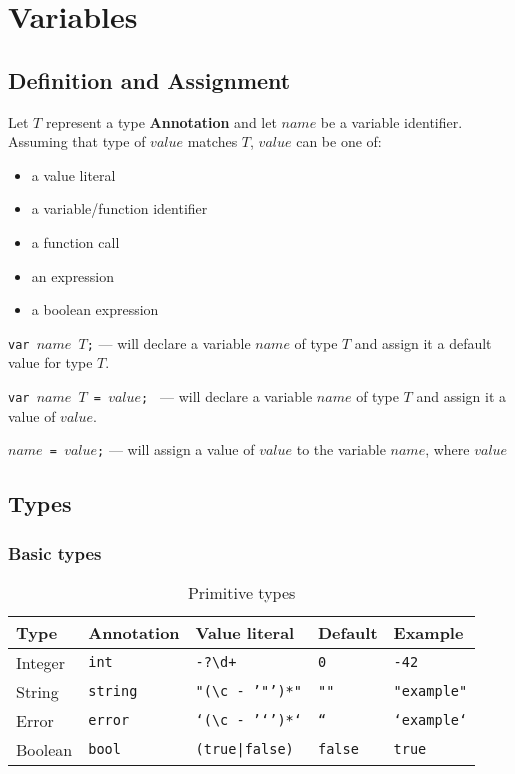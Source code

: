 \documentclass{article}
\begin{document}
\section{Variables}

\subsection{Definition and Assignment}
Let $T$ represent a type \textbf{Annotation} and let $name$ be a variable
identifier. Assuming that type of $value$ matches $T$, $value$ can be one of:
\begin{itemize}
  \setlength\itemsep{.1em}
  \item a value literal
  \item a variable/function identifier
  \item a function call
  \item an expression
  \item a boolean expression
\end{itemize}

\texttt{var $name$ $T$;} --- will declare a variable $name$ of type $T$ and assign
it a default value for type $T$.

\texttt{var $name$ $T$ = $value$; } --- will declare a variable $name$ of type $T$
and assign it a value of $value$.

\texttt{$name$ = $value$;} --- will assign a value of $value$ to the variable
$name$, where $value$

\subsection{Types}

\subsubsection{Basic types}

\begin{table}[h]
\centering
\label{primitive-types}
\begin{tabular}{|l|l|l|l|l|} \hline
\textbf{Type} & \textbf{Annotation} & \textbf{Value literal}               & \textbf{Default} & \textbf{Example}   \\ \hline
Integer       & \texttt{int}        & \texttt{-?\textbackslash d+}         & \texttt{0}       & \texttt{-42}       \\ \hline
String        & \texttt{string}     & \texttt{"(\textbackslash c - '"')*"} & \texttt{""}      & \texttt{"example"} \\ \hline
Error         & \texttt{error}      & \texttt{`(\textbackslash c - '`')*`} & \texttt{``}      & \texttt{`example`} \\ \hline
Boolean       & \texttt{bool}       & \texttt{(true|false)}                & \texttt{false}   & \texttt{true}      \\ \hline
\end{tabular}
\caption{Primitive types}
\end{table}
\end{document}

